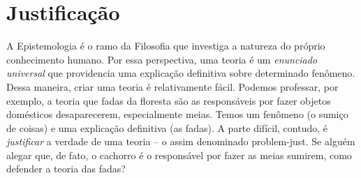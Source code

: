 \documentclass[./main.tex]{subfiles}
\begin{document}
\section{Justificação} \label{episteme:justification}

\par A Epistemologia é o ramo da Filosofia que investiga a natureza do próprio conhecimento humano. Por essa perspectiva, uma \gls{teoria} é um \textit{enunciado universal} que providencia uma explicação definitiva sobre determinado fenômeno. Dessa maneira, criar uma teoria é relativamente fácil. Podemos professar, por exemplo, a teoria que fadas da floresta são as responsáveis por fazer objetos domésticos desaparecerem, especialmente meias. Temos um fenômeno (o sumiço de coisas) e uma explicação definitiva (as fadas). A parte difícil, contudo, é \textit{justificar} a verdade de uma teoria -- o assim denominado \gls{problem-just}. Se alguém alegar que, de fato, o cachorro é o responsável por fazer as meias sumirem, como defender a teoria das fadas?
\end{document}
